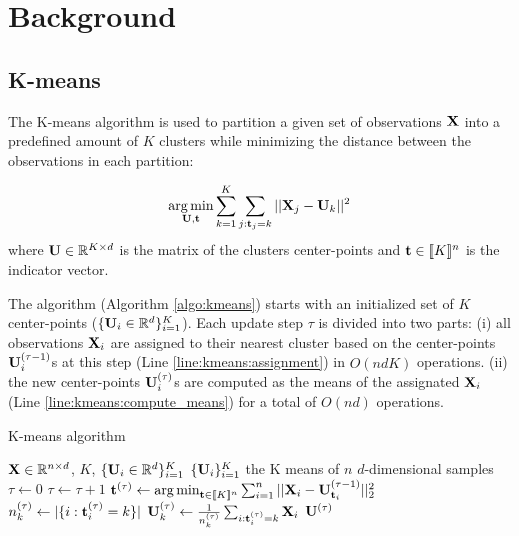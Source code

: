 \section{Background}

\subsection{K-means}

The K-means algorithm is used to partition a given set of observations ${\mathbf{X}}$ into a predefined amount of $K$ clusters while minimizing the distance between the observations in each partition:

\begin{equation}
\label{eq:kmean_problem}
    \operatorname*{arg\,min}_{{\mathbf{U}}, {\mathbf{t}}} \sum_{k=1}^{K} \sum_{j: {\mathbf{t}}_j = k} ||{\mathbf{X}}_j -{\mathbf{U}}_k||^2 \\
\end{equation}
where ${\mathbf{U}} \in \mathbb{R}^{K \times d}$ is the matrix of the clusters center-points and ${\mathbf{t}} \in  [\![K]\!]^n$ is the indicator vector.

The algorithm (Algorithm \ref{algo:kmeans}) starts with an initialized set of $K$ center-points ($\{{\mathbf{U}}_i \in \mathbb{R}^d\}_{i=1}^{K}$). Each update step $\tau$ is divided into two parts: (i) all observations ${\mathbf{X}}_i$ are assigned to their nearest cluster based on the center-points ${\mathbf{U}}_i^{(\tau-1)}$s at this step (Line \ref{line:kmeans:assignment}) in $O(ndK)$ operations. (ii) the new center-points ${\mathbf{U}}_i^{(\tau)}$s are computed as the means of the assignated ${\mathbf{X}}_i$ (Line \ref{line:kmeans:compute_means}) for a total of $O(nd)$ operations.

\begin{algorithm}
\caption{K-means algorithm}
\label{algo:kmeans}
\begin{algorithmic}[1]


\REQUIRE ${\mathbf{X}} \in \mathbb{R}^{n \times d}$, $K$, $\{{\mathbf{U}}_i \in \mathbb{R}^d\}_{i=1}^{K}$
\ENSURE $\{{\mathbf{U}}_i\}_{i=1}^{K}$ the K means of $n$ $d$-dimensional samples
\STATE $\tau \leftarrow 0$
\REPEAT
\STATE $\tau \leftarrow \tau + 1$
\STATE ${\mathbf{t}}^{(\tau)} \leftarrow \operatorname*{arg\,min}_{{\mathbf{t}} \in [\![K]\!]^n} \sum_{i=1}^{n} {||{\mathbf{X}}_i - {\mathbf{U}}^{(\tau-1)}_{{\mathbf{t}}_i}||_2^2}$
\label{line:kmeans:assignment}
\STATE $n_k^{(\tau)} \leftarrow |\{i: {\mathbf{t}}^{(\tau)}_i=k\}|$
\label{line:kmeans:count}
\STATE ${\mathbf{U}}^{(\tau)}_k \leftarrow \frac{1}{n_k^{(\tau)}} \sum_{i: {\mathbf{t}}^{(\tau)}_i = k} {{\mathbf{X}}_i}$
\label{line:kmeans:compute_means}
\ENDFOR
{}
\RETURN ${\mathbf{U}}^{(\tau)}$
\end{algorithmic}
\end{algorithm}


